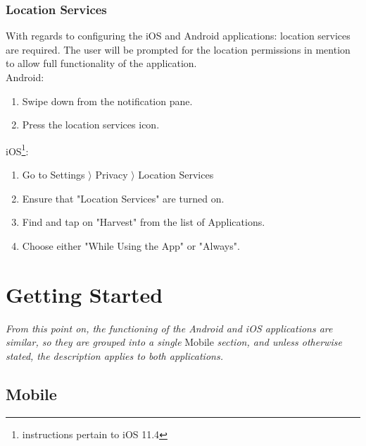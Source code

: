 \documentclass[11pt]{article}
\begin{document}
\subsubsection{Location Services}
With regards to configuring the iOS and Android applications: location services are required. The user will be prompted for the location permissions in mention to allow full functionality of the application.\\
Android:
\begin{enumerate}
 \item Swipe down from the notification pane.
 \item Press the location services icon.
\end{enumerate}
iOS\footnote{instructions pertain to iOS 11.4}:
\begin{enumerate}
 \item Go to Settings $\rangle$ Privacy $\rangle$ Location Services
 \item Ensure that "Location Services" are turned on.
 \item Find and tap on "Harvest" from the list of Applications.
 \item Choose either "While Using the App" or "Always".
\end{enumerate}

\newpage
\section{Getting Started}
\textit{From this point on, the functioning of the Android and iOS applications are similar, so they are grouped into a single} Mobile \textit{section, and unless otherwise stated, the description applies to both applications.}

\subsection{Mobile}
\end{document}
